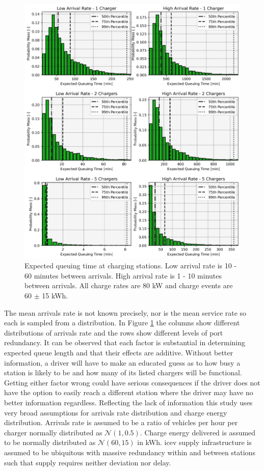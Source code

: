 \documentclass[11pt]{article}
\begin{document}
\begin{multicols}{2}
\begin{figure}[H]
	\centering
	\includegraphics[width = \linewidth]{figs/expected_delay.png}
	\caption{Expected queuing time at charging stations. Low arrival rate is 10 - 60 minutes between arrivals. High arrival rate is 1 - 10 minutes between arrivals. All charge rates are 80 kW and charge events are 60 $\pm$ 15 kWh.}
	\label{fig:expected_delay}
\end{figure}

The mean arrivals rate is not known precisely, nor is the mean service rate so each is sampled from a distribution. In Figure \ref{fig:expected_delay} the columns show different distributions of arrivals rate and the rows show different levels of port redundancy. It can be observed that each factor is substantial in determining expected queue length and that their effects are additive. Without better information, a driver will have to make an educated guess as to how busy a station is likely to be and how many of its listed chargers will be functional. Getting either factor wrong could have serious consequences if the driver does not have the option to easily reach a different station where the driver may have no better information regardless. Reflecting the lack of information this study uses very broad assumptions for arrivals rate distribution and charge energy distribution. Arrivals rate is assumed to be a ratio of vehicles per hour per charger normally distributed as $\mathcal{N}(1, 0.5)$. Charge energy delivered is assumed to be normally distributed as $\mathcal{N}(60, 15)$ in kWh. \gls{icev} supply infrastructure is assumed to be ubiquitous with massive redundancy within and between stations such that supply requires neither deviation nor delay.


\end{multicols}
\end{document}
